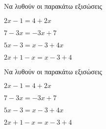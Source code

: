 Να λυθούν οι παρακάτω εξισώσεις
\begin{rlist}
\item $ 2x-1=4+2x $
\item $ 7-3x=-3x+7 $
\item $ 5x-3=x-3+4x $
\item $ 2x+1-x=x-3+4 $
\end{rlist}
Να λυθούν οι παρακάτω εξισώσεις
\begin{rlist}
\item $ 2x-1=4+2x $
\item $ 7-3x=-3x+7 $
\item $ 5x-3=x-3+4x $
\item $ 2x+1-x=x-3+4 $
\end{rlist}
